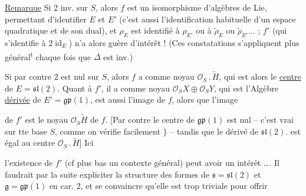 \uline{Remarque} Si 2 inv. sur $S$, alors $f$ est un isomorphisme d'algèbres de Lie,  permettant d'identifier $E$ et $E'$ (c'est aussi l'identification habituelle d'un espace quadratique et de son dual), et $\rho_E$ est identifié à $\rho_{E'}$ ou à $\widetilde\rho_E$ ou $\widetilde\rho_{E'}\ldots$ ; $f'$ (qui s'identifie à $2\operatorname{id}_E$) n'a alors guère d'intérêt ! (Ces constatations s'appliquent plus général\textsuperscript{t} chaque fois que $\Delta$ est inv.)

Si par contre 2 est nul sur $S$, alors $f$ a comme noyau $\mathscr O_S\mathbin{.}\widetilde H$, qui est alors le \uline{centre} de $E=\mathfrak{sl}(2)$. Quant à $f'$, il a comme noyau $\mathscr O_S X\oplus\mathscr O_S Y$, qui est   l'Algèbre \uline{dérivée} de $E'=\mathfrak{gp}(1)$,   est aussi l'image de $f$, alors que l'image


de $f'$ est le noyau $\mathscr O_S\widetilde H$ de $f$. [Par contre le centre de $\mathfrak{gp}(1)$ est nul -- c'est vrai sur tte base $S$, comme on vérifie facilement $\}$ -- tandis que le  dérivé de $\mathfrak{sl}(2).$ est égal au centre $\mathscr O_S\mathbin{.}\widetilde H$] Ici

l'existence de $f'$ (cf plus bas un contexte général) peut avoir un intérêt \ldots. Il faudrait par la suite expliciter la structure des formes de $\mathfrak s=\mathfrak{sl}(2)$ et $\mathfrak g=\mathfrak{gp}(1)$ en car. 2, et se convaincre qu'elle est trop triviale pour offrir

